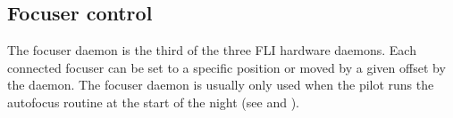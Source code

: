 
\subsection{Focuser control}
\label{sec:foc}
\begin{colsection}

The focuser daemon is the third of the three FLI hardware daemons. Each connected focuser can be set to a specific position or moved by a given offset by the daemon. The focuser daemon is usually only used when the pilot runs the autofocus routine at the start of the night (see  and ).

\end{colsection}


